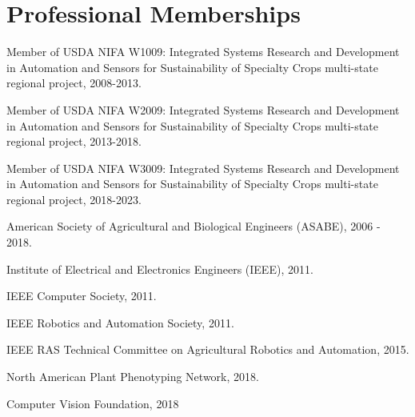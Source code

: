 \documentclass[letterpaper,11pt]{article}
\begin{document}
\section{Professional Memberships}
\begin{enumerate}[noitemsep, leftmargin=*,label={[\arabic*]}]
\item{Member of USDA NIFA W1009: Integrated Systems Research and Development in Automation and Sensors for Sustainability of Specialty Crops multi-state regional project, 2008-2013. }
\item{Member of USDA NIFA W2009: Integrated Systems Research and Development in Automation and Sensors for Sustainability of Specialty Crops multi-state regional project, 2013-2018. }
\item{Member of USDA NIFA W3009: Integrated Systems Research and Development in Automation and Sensors for Sustainability of Specialty Crops multi-state regional project, 2018-2023. }
\item{American Society of Agricultural and Biological Engineers (ASABE), 2006 - 2018.}
\item{Institute of Electrical and Electronics Engineers (IEEE), 2011.}
\item{IEEE Computer Society, 2011.}
\item{IEEE Robotics and Automation Society, 2011.}
\item{IEEE RAS Technical Committee on Agricultural Robotics and Automation, 2015.}
\item{North American Plant Phenotyping Network, 2018.}
\item{Computer Vision Foundation, 2018}
\end{enumerate}

\end{document}
